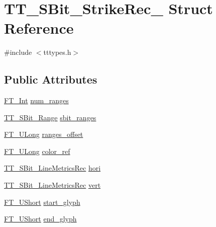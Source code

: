 \hypertarget{struct_t_t___s_bit___strike_rec__}{\section{T\-T\-\_\-\-S\-Bit\-\_\-\-Strike\-Rec\-\_\- Struct Reference}
\label{struct_t_t___s_bit___strike_rec__}
}


{\ttfamily \#include $<$tttypes.\-h$>$}

\subsection*{Public Attributes}
\begin{DoxyCompactItemize}
\item 
\hyperlink{fttypes_8h_af90e5fb0d07e21be9fe6faa33f02484c}{F\-T\-\_\-\-Int} \hyperlink{struct_t_t___s_bit___strike_rec___ae35a351f37cdc865f039056cd233d037}{num\-\_\-ranges}
\item 
\hyperlink{tttypes_8h_aa8d90bac8664dd99e02e71c830cb8a03}{T\-T\-\_\-\-S\-Bit\-\_\-\-Range} \hyperlink{struct_t_t___s_bit___strike_rec___a63fb916bdfa41489a180af34b4c092a0}{sbit\-\_\-ranges}
\item 
\hyperlink{fttypes_8h_a4fac88bdba78eb76b505efa6e4fbf3f5}{F\-T\-\_\-\-U\-Long} \hyperlink{struct_t_t___s_bit___strike_rec___a740ed4c52dd359f7db5f47c5c4d9f11b}{ranges\-\_\-offset}
\item 
\hyperlink{fttypes_8h_a4fac88bdba78eb76b505efa6e4fbf3f5}{F\-T\-\_\-\-U\-Long} \hyperlink{struct_t_t___s_bit___strike_rec___a5279b83c90ce3c5019575e6a2aaed8e9}{color\-\_\-ref}
\item 
\hyperlink{tttypes_8h_a794b22300df0ccb224faed6c178e9ece}{T\-T\-\_\-\-S\-Bit\-\_\-\-Line\-Metrics\-Rec} \hyperlink{struct_t_t___s_bit___strike_rec___a19b500dbcd1542dcfa92ea7e80f5c21e}{hori}
\item 
\hyperlink{tttypes_8h_a794b22300df0ccb224faed6c178e9ece}{T\-T\-\_\-\-S\-Bit\-\_\-\-Line\-Metrics\-Rec} \hyperlink{struct_t_t___s_bit___strike_rec___a5366f6968d1126891f2a6f27345abd5c}{vert}
\item 
\hyperlink{fttypes_8h_a937f6c17cf5ffd09086d8610c37b9f58}{F\-T\-\_\-\-U\-Short} \hyperlink{struct_t_t___s_bit___strike_rec___a05032d4092eef7e7214bb82d4113d8b9}{start\-\_\-glyph}
\item 
\hyperlink{fttypes_8h_a937f6c17cf5ffd09086d8610c37b9f58}{F\-T\-\_\-\-U\-Short} \hyperlink{struct_t_t___s_bit___strike_rec___a1af21e0ef936193b22575ea75bad487f}{end\-\_\-glyph}

\end{DoxyCompactItemize}
